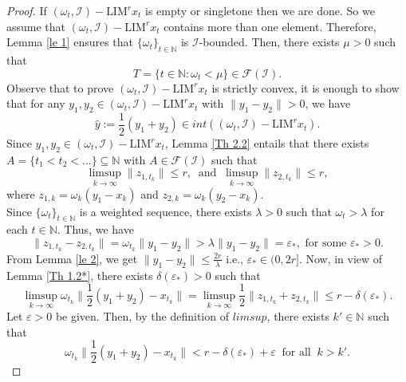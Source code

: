 \documentclass[reqno]{amsart}
\begin{document}
{\begin{proof}
	If $(\omega_t,\mathcal{I})-\text{LIM}^{r} x_t$ is empty or singletone then we are done. So we assume that $(\omega_t,\mathcal{I})-\text{LIM}^{r} x_t$ contains more than one element. Therefore, Lemma \ref{le 1} ensures that $\{\omega_t\}_{t\in\mathbb{N}}$ is $\mathcal{I}$-bounded. Then, there exists $\mu>0$ such that 
	$$
	T=\{t\in\mathbb{N}: \omega_t<\mu\}\in\mathcal{F}(\mathcal{I}).
	$$ 
Observe that to prove $(\omega_t,\mathcal{I})-\text{LIM}^{r} x_t$ is strictly convex, it is enough to show that for any $y_1,y_2\in(\omega_t,\mathcal{I})-\text{LIM}^{r} x_t$ with $\|y_1-y_2\|>0$, we have
	$$
	\hat{y}:=\frac{1}{2}(y_1+y_2)\in int((\omega_t,\mathcal{I})-\text{LIM}^{r} x_t).
	$$
	Since $y_1,y_2\in(\omega_t,\mathcal{I})-\text{LIM}^{r} x_t$, Lemma \ref{Th 2.2} entails that
	there exists $A=\{t_1<t_2<...\}\subseteq\mathbb{N}$ with $A\in\mathcal{F}(\mathcal{I})$ such that \begin{equation*} \limsup_{k\to\infty}\|z_{1,t_k}\|\leq r,~\mbox{ and }~ \limsup_{k\to\infty}\|z_{2,t_k}\|\leq r, \end{equation*}
	where $z_{1,k}=\omega_k(y_1-x_k)$ and $z_{2,k}=\omega_k(y_2-x_k)$.\\
	Since $\{\omega_t\}_{t\in\mathbb{N}}$ is a weighted sequence, there exists $\lambda>0$ such that
	$\omega_t>\lambda$ for each $t\in\mathbb{N}.$ Thus, we have 
	\begin{equation*}\|z_{1,t_k}-z_{2,t_k}\|
		=\omega_{t_k}\|y_1-y_2\|> \lambda\|y_1-y_2\|=\varepsilon_*, \mbox{ for some }\varepsilon_*>0.
	\end{equation*}
	From Lemma \ref{le 2}, we get $\|y_1-y_2\|\leq  \frac{2r}{\lambda}$ i.e., $\varepsilon_* \in (0,2r].$  Now, in view of Lemma {\ref{Th 1.2*}}, there exists $\delta(\varepsilon_*)>0$ such that
	\begin{equation*}\limsup_{k\to\infty}\omega_{t_k}\|\frac{1}{2}(y_1+y_2)-x_{t_k}\|=\limsup_{k\to\infty}\frac{1}{2}\|z_{1,t_k}+z_{2,t_k}\|\leq r-\delta(\varepsilon_*).\end{equation*}
	Let $\varepsilon>0$ be given. Then, by the definition of $limsup$, there exists $k'\in\mathbb{N}$ such that 
	\begin{equation*}\omega_{t_k}\|\frac{1}{2}(y_1+y_2)-x_{t_k}\|<r-\delta(\varepsilon_*)+\varepsilon~\mbox{ for all }~k>k'.\end{equation*}

\end{proof}}
\end{document}
